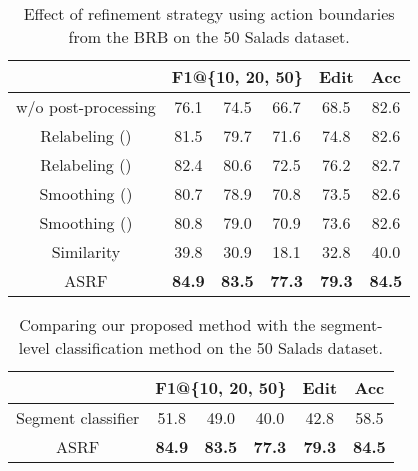 \documentclass[10pt,twocolumn,letterpaper]{article}
\begin{document}
\begin{table}[t]
\small
\centering
\begin{tabular}{cccccc}
\hline
                              & \multicolumn{3}{c}{F1@\{10, 20, 50\}} & Edit & Acc \\ \hline
w/o post-processing           & 76.1          & 74.5          & 66.7          & 68.5          & 82.6 \\
Relabeling ()   & 81.5          & 79.7          & 71.6          & 74.8          & 82.6 \\
Relabeling ()  & 82.4          & 80.6          & 72.5          & 76.2          & 82.7 \\
Smoothing ()           & 80.7          & 78.9          & 70.8          & 73.5          & 82.6 \\
Smoothing ()          & 80.8          & 79.0          & 70.9          & 73.6          & 82.6 \\
Similarity                    & 39.8          & 30.9          & 18.1          & 32.8          & 40.0\\ \hline
ASRF                          & \textbf{84.9} & \textbf{83.5} & \textbf{77.3} & \textbf{79.3} & \textbf{84.5}  \\ \hline
\end{tabular}
\caption{Effect of refinement strategy using action boundaries from the BRB on the 50 Salads dataset.}
\label{tab:BRN}
\vspace{-3pt}
\end{table}


\begin{table}[t]
\small
\centering
\begin{tabular}{cccccc}
\hline
                                  & \multicolumn{3}{c}{F1@\{10, 20, 50\}} & Edit & Acc \\ \hline
Segment classifier                & 51.8   & 49.0   & 40.0   & 42.8   & 58.5   \\
ASRF                              & \textbf{84.9} & \textbf{83.5} & \textbf{77.3} & \textbf{79.3} & \textbf{84.5}   \\ \hline
\end{tabular}
\caption{Comparing our proposed method with the segment-level classification method on the 50 Salads dataset.}
\label{tab:seg_lev_cls}
\vspace{-5pt}
\end{table}
\end{document}
